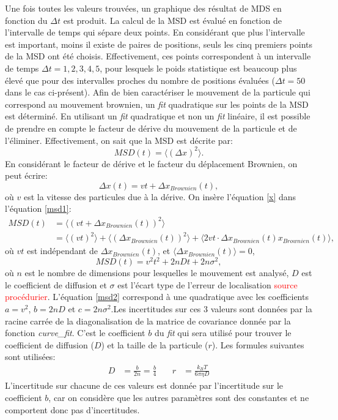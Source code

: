 \documentclass[11pt,letterpaper]{article}
\begin{document}
Une fois toutes les valeurs trouvées, un graphique des résultat de MDS en fonction du $\Delta t$ est produit. La calcul de la MSD est évalué en fonction de l'intervalle de temps
qui sépare deux points. En considérant que plus l'intervalle est important, moins il existe de paires de positions, seuls les cinq premiers points de
la MSD ont été choisis. Effectivement, ces points correspondent à un intervalle de temps $\Delta t=1,2,3,4,5$, pour lesquels le poids statistique est beaucoup plus élevé
que pour des intervalles proches du nombre de positions évaluées ($\Delta t=50$ dans le cas ci-présent).
Afin de bien caractériser le mouvement de la particule
qui correspond au mouvement brownien, un \textit{fit} quadratique sur les points de la MSD est déterminé. 
En utilisant un \textit{fit} quadratique et non un \textit{fit} linéaire,
il est possible de prendre en compte le facteur de dérive du mouvement de la particule et de l'éliminer. Effectivement, on sait que la MSD est décrite par:
\begin{equation}\label{msd1}
  MSD(t)=\langle\left(\Delta x \right)^2\rangle.
\end{equation} 
En considérant le facteur de dérive et le facteur du déplacement Brownien, on peut écrire:
\begin{equation}\label{x}
  \Delta x (t)=vt+\Delta x_{Brownien}(t),
\end{equation} 
où $v$ est la vitesse des particules due à la dérive. On insère l'équation \ref{x} dans l'équation \ref{msd1}:
\begin{align*}
  MSD(t)&=\langle\left(vt+\Delta x_{Brownien}(t) \right)^2\rangle\\
  &=\langle\left(vt\right)^2\rangle+\langle\left(\Delta x_{Brownien}(t)\right)^2\rangle+\langle2vt\cdot \Delta x_{Brownien}(t)x_{Brownien}(t)\rangle,
\end{align*}
où $vt$ est indépendant de $\Delta x_{Brownien}(t)$, et $\langle\Delta x_{Brownien}(t)\rangle=0$,
\begin{equation}\label{msd2}
  MSD(t)=v^2t^2+2nDt+2n\sigma^2,
\end{equation}
où $n$ est le nombre de dimensions pour lesquelles le mouvement est analysé, $D$ est le coefficient de diffusion et $\sigma$ est l'écart type
de l'erreur de localisation \textcolor{red}{source procédurier}. L'équation \ref{msd2} correspond à une quadratique avec
les coefficients $a=v^2$, $b=2nD$ et $c=2n\sigma^2$.Les incertitudes sur ces 3 valeurs sont données par la racine carrée 
de la diagonalisation de la matrice de covariance donnée par la fonction \textit{curve\_fit}. 
C'est le coefficient $b$ du \textit{fit} qui sera utilisé pour trouver le coefficient de diffusion ($D$) et la taille de la particule ($r$). Les formules suivantes sont utilisées: 
\begin{align*}
  D &= \frac{b}{2n}=\frac{b}{4} \quad & r &= \frac{k_B T}{6 \pi \eta D}
\end{align*}
L'incertitude sur chacune de ces valeurs est donnée par l'incertitude sur le coefficient $b$, car on considère que les autres paramètres sont des constantes
et ne comportent donc pas d'incertitudes. 
\end{document}
